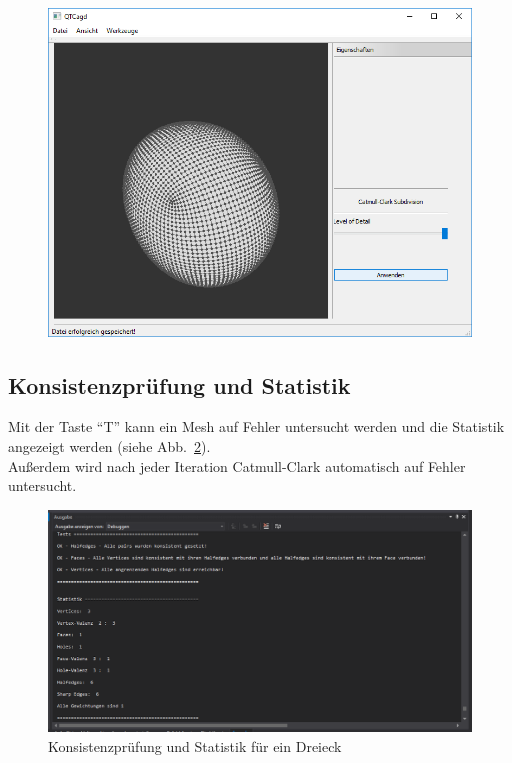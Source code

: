 \begin{figure}[H]
	\centering
	\includegraphics[scale=0.5]{content/pictures/8-MeshCatmullClark}
	\caption{}
	\label{fig:MeshCatmullClark}
\end{figure}

\subsection{Konsistenzprüfung und Statistik}
Mit der Taste "`T"' kann ein Mesh auf Fehler untersucht werden und die Statistik angezeigt werden (siehe Abb.~\ref{fig:TestStatistik}).\\
Au\ss{}erdem wird nach jeder Iteration Catmull-Clark automatisch auf Fehler untersucht.

\begin{figure}[H]
	\centering
	\includegraphics[scale=0.5]{content/pictures/9-TestStatistik}
	\caption{Konsistenzprüfung und Statistik für ein Dreieck}
	\label{fig:TestStatistik}
\end{figure}
